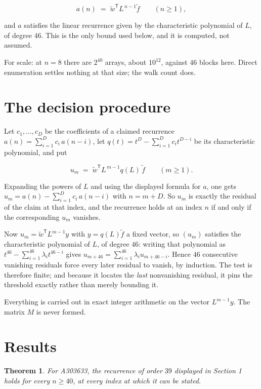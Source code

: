 \documentclass[11pt]{article}
\newtheorem{theorem}{Theorem}
\theoremstyle{definition}
\begin{document}
\[a(n) \;=\; \tilde w^{\mathsf T} L^{\,n-1} \tilde f \qquad (n \ge 1),\]

and $a$ satisfies the linear recurrence given by the characteristic polynomial of $L$, of degree $46$. This is the only bound used below, and it is computed, not assumed.

For scale: at $n = 8$ there are $2^{40}$ arrays, about $10^{12}$, against $46$ blocks here. Direct enumeration settles nothing at that size; the walk count does.

\section{The decision procedure}

Let $c_1,\dots,c_D$ be the coefficients of a claimed recurrence $a(n) = \sum_{i=1}^{D} c_i\,a(n-i)$, let $q(t) = t^{D} - \sum_{i=1}^{D} c_i t^{D-i}$ be its characteristic polynomial, and put

\[u_m \;=\; \tilde w^{\mathsf T} L^{\,m-1} q(L)\,\tilde f \qquad (m \ge 1).\]

Expanding the powers of $L$ and using the displayed formula for $a$, one gets $u_m = a(n) - \sum_{i=1}^{D} c_i\,a(n-i)$ with $n = m + D$. So $u_m$ is exactly the residual of the claim at that index, and the recurrence holds at an index $n$ if and only if the corresponding $u_m$ vanishes.

Now $u_m = \tilde w^{\mathsf T} L^{m-1} y$ with $y = q(L)\tilde f$ a fixed vector, so $(u_m)$ satisfies the characteristic polynomial of $L$, of degree $46$: writing that polynomial as $t^{46} - \sum_{i=1}^{46} \lambda_i t^{46-i}$ gives $u_{m+46} = \sum_{i=1}^{46} \lambda_i u_{m+46-i}$. Hence $46$ consecutive vanishing residuals force every later residual to vanish, by induction. The test is therefore finite; and because it locates the {\itshape last} nonvanishing residual, it pins the threshold exactly rather than merely bounding it.

Everything is carried out in exact integer arithmetic on the vector $L^{m-1}y$. The matrix $M$ is never formed.

\section{Results}

\begin{theorem} For A303633, the recurrence of order $39$ displayed in Section 1 holds for every $n \ge 40$, at every index at which it can be stated.\end{theorem}
\end{document}
